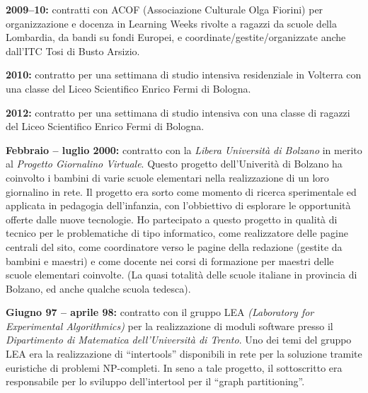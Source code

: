 \documentclass[10pt]{article}
\begin{document}
\noindent
{\bf 2009--10:}
contratti con ACOF (Associazione Culturale Olga Fiorini)
per organizzazione e docenza
in Learning Weeks rivolte a ragazzi da scuole della Lombardia,
da bandi su fondi Europei,
e coordinate/gestite/organizzate anche dall'ITC Tosi di Busto Arsizio.


\noindent
{\bf 2010:}
contratto per una settimana di studio intensiva residenziale in Volterra
con una classe del Liceo Scientifico Enrico Fermi di Bologna. 

\noindent
{\bf 2012:}
contratto per una settimana di studio intensiva
con una classe di ragazzi del Liceo Scientifico Enrico Fermi di Bologna. 

\noindent
{\bf Febbraio -- luglio 2000:}
contratto con la {\em Libera Universit\`a di Bolzano}
in merito al {\em Progetto Giornalino Virtuale}.
Questo progetto dell'Univerit\`a di Bolzano
ha coinvolto i bambini di varie scuole elementari
nella realizzazione di un loro giornalino in rete.
Il progetto era sorto
come momento di ricerca sperimentale ed applicata
in pedagogia dell'infanzia, con l'obbiettivo
di esplorare le opportunit\`a offerte dalle nuove tecnologie. 
Ho partecipato a questo progetto
in qualit\`a di tecnico
per le problematiche di tipo informatico,
come realizzatore delle pagine centrali del sito,
come coordinatore verso le pagine della redazione (gestite da bambini
e maestri) e come docente nei corsi di formazione per
maestri delle scuole elementari coinvolte.
(La quasi totalit\`a delle scuole italiane in provincia di Bolzano,
ed anche qualche scuola tedesca).

\noindent
{\bf Giugno 97 -- aprile 98:}
contratto con il gruppo LEA {\em (Laboratory for Experimental Algorithmics)}
per la realizzazione di moduli software
presso il {\em Dipartimento di Matematica dell'Universit\`a di Trento}.
Uno dei temi del gruppo LEA
era la realizzazione di ``intertools''
disponibili in rete per la soluzione tramite euristiche
di problemi NP-completi.
In seno a tale progetto,
il sottoscritto era responsabile per lo sviluppo dell'intertool
per il ``graph partitioning''.\\
\end{document}
